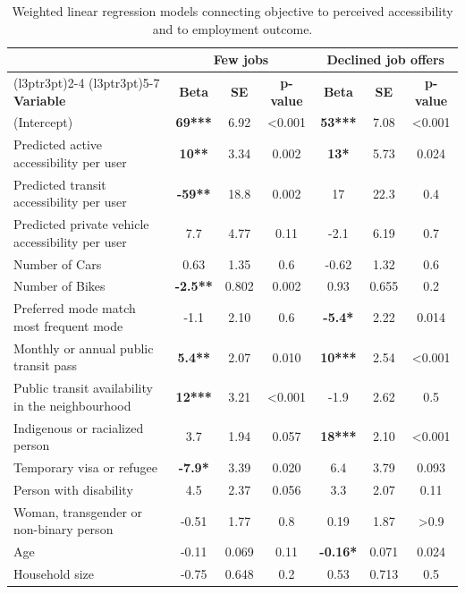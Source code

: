\documentclass[preprint, 3p,
authoryear]{elsarticle} %
\begin{document}
\begin{table}

\caption{\label{tab:unnamed-chunk-7}\label{tab:linear_models}Weighted linear regression models connecting objective to perceived accessibility and to employment outcome. }
\centering
\begin{tabular}[t]{lcccccc}
\toprule
\multicolumn{1}{c}{ } & \multicolumn{3}{c}{\textbf{Few jobs}} & \multicolumn{3}{c}{\textbf{Declined job offers}} \\
\cmidrule(l{3pt}r{3pt}){2-4} \cmidrule(l{3pt}r{3pt}){5-7}
\textbf{Variable} & \textbf{Beta} & \textbf{SE} & \textbf{p-value} & \textbf{Beta} & \textbf{SE} & \textbf{p-value}\\
\midrule
(Intercept) & \textbf{69***} & 6.92 & <0.001 & \textbf{53***} & 7.08 & <0.001\\
Predicted active accessibility per user & \textbf{10**} & 3.34 & 0.002 & \textbf{13*} & 5.73 & 0.024\\
Predicted transit accessibility per user & \textbf{-59**} & 18.8 & 0.002 & 17 & 22.3 & 0.4\\
Predicted private vehicle accessibility per user & 7.7 & 4.77 & 0.11 & -2.1 & 6.19 & 0.7\\
Number of Cars & 0.63 & 1.35 & 0.6 & -0.62 & 1.32 & 0.6\\
\addlinespace
Number of Bikes & \textbf{-2.5**} & 0.802 & 0.002 & 0.93 & 0.655 & 0.2\\
Preferred mode match most frequent mode & -1.1 & 2.10 & 0.6 & \textbf{-5.4*} & 2.22 & 0.014\\
Monthly or annual public transit pass & \textbf{5.4**} & 2.07 & 0.010 & \textbf{10***} & 2.54 & <0.001\\
Public transit availability in the neighbourhood & \textbf{12***} & 3.21 & <0.001 & -1.9 & 2.62 & 0.5\\
Indigenous or racialized person & 3.7 & 1.94 & 0.057 & \textbf{18***} & 2.10 & <0.001\\
\addlinespace
Temporary visa or refugee & \textbf{-7.9*} & 3.39 & 0.020 & 6.4 & 3.79 & 0.093\\
Person with disability & 4.5 & 2.37 & 0.056 & 3.3 & 2.07 & 0.11\\
Woman, transgender or non-binary person & -0.51 & 1.77 & 0.8 & 0.19 & 1.87 & >0.9\\
Age & -0.11 & 0.069 & 0.11 & \textbf{-0.16*} & 0.071 & 0.024\\
Household size & -0.75 & 0.648 & 0.2 & 0.53 & 0.713 & 0.5\\

\end{tabular}
\end{table}
\end{document}
